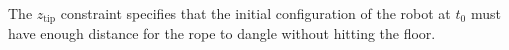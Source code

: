 \documentclass[conference]{IEEEtran}
\begin{document}
The $z_{\mathrm{tip}}$ constraint specifies that the initial configuration of the robot at $t_0$ must have enough distance for the rope to dangle without hitting the floor. 
















\end{document}
